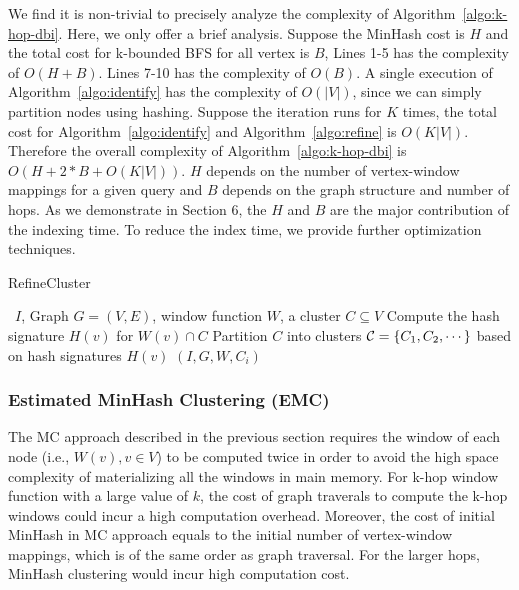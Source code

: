 We find it is non-trivial to precisely analyze the complexity of Algorithm~\ref{algo:k-hop-dbi}. Here, we only offer a brief analysis. Suppose the MinHash cost is $H$ and the total cost for k-bounded BFS for all vertex is $B$, Lines 1-5 has the complexity of $O(H + B)$.  Lines 7-10 has the complexity of $O(B)$. A single execution of Algorithm~\ref{algo:identify}  has the  complexity of $O(|V|)$, since we can simply partition nodes using hashing. Suppose the iteration runs for $K$ times, the total cost for Algorithm~\ref{algo:identify} and Algorithm~\ref{algo:refine} is $O(K|V|)$. Therefore the overall complexity of Algorithm~\ref{algo:k-hop-dbi} is $O(H+2*B + O(K|V|))$. $H$ depends on the number of vertex-window mappings for a given query and $B$ depends on the graph structure and number of hops. As we demonstrate in Section 6, the $H$ and $B$ are the major contribution of the indexing time. To reduce the index time, we provide further optimization techniques.


\begin{algorithm}
\caption{RefineCluster}
\begin{algorithmic}[1]
\Require \DBIndex\ $I$, Graph $G=(V,E)$, window function $W$, a cluster $C \subseteq V$
{}
	\State Compute the hash signature $H(v)$ for $W(v) \cap C$
\EndFor
\State Partition $C$ into clusters ${\cal C} = \{C_1,C_2,\cdots\}$ based on hash signatures $H(v)$
	 $(I,G,W,C_i)$
\EndFor
\end{algorithmic}
\label{algo:refine}
\end{algorithm}

\subsubsection{Estimated MinHash Clustering (EMC)}
\label{sec:optimized}

The MC approach described in the previous section requires the window of each node (i.e., $W(v), v \in V$)
to be computed twice in order to avoid the high space complexity of materializing all the windows in main memory.
For k-hop window function with a large value of $k$, the cost of graph traverals to compute the k-hop windows
could incur a high computation overhead. Moreover, the cost of initial MinHash in MC approach equals to the initial number of vertex-window mappings, which is of the same order as graph traversal. For the larger hops, MinHash clustering would incur high computation cost.

